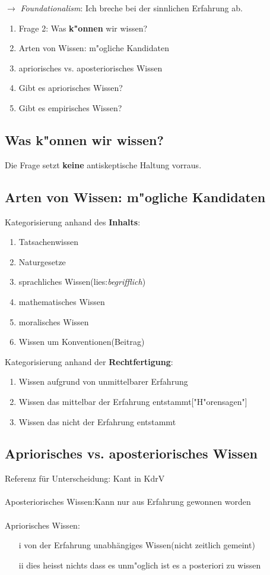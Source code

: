 \documentclass[emulatestandardclasses]{scrartcl}
\begin{document}
$\rightarrow$ \emph{Foundationalism}: Ich breche bei der sinnlichen Erfahrung ab.

\begin{enumerate}
	\item Frage 2: Was \textbf{k"onnen} wir wissen?
	\item Arten von Wissen: m"ogliche Kandidaten
	\item apriorisches vs. aposteriorisches Wissen
	\item Gibt es apriorisches Wissen?
	\item Gibt es empirisches Wissen?
\end{enumerate}
\subsection{Was k"onnen wir wissen?}
Die Frage setzt \textbf{keine} antiskeptische Haltung vorraus.
\subsection{Arten von Wissen: m"ogliche Kandidaten}
Kategorisierung anhand des \textbf{Inhalts}:
\begin{enumerate}
	\item Tatsachenwissen
	\item Naturgesetze
	\item sprachliches Wissen(lies:\textit{begrifflich})
	\item mathematisches Wissen
	\item moralisches Wissen
	\item Wissen um Konventionen(Beitrag)
\end{enumerate}
Kategorisierung anhand der \textbf{Rechtfertigung}:
\begin{enumerate}
	\item Wissen aufgrund von unmittelbarer Erfahrung
	\item Wissen das mittelbar der Erfahrung entstammt["H"orensagen"]
	\item Wissen das nicht der Erfahrung entstammt
\end{enumerate}
\subsection{Apriorisches vs. aposteriorisches Wissen}
Referenz für Unterscheidung: Kant in KdrV
\\ \\
Aposteriorisches Wissen:Kann nur aus Erfahrung gewonnen worden
\\ \\
Apriorisches Wissen:
\begin{itemize}
	\item[i]von der Erfahrung unabhängiges Wissen(nicht zeitlich gemeint)
	\item[ii] dies heisst nichts dass es unm"oglich ist es a posteriori zu wissen
\end{itemize}
\end{document}
